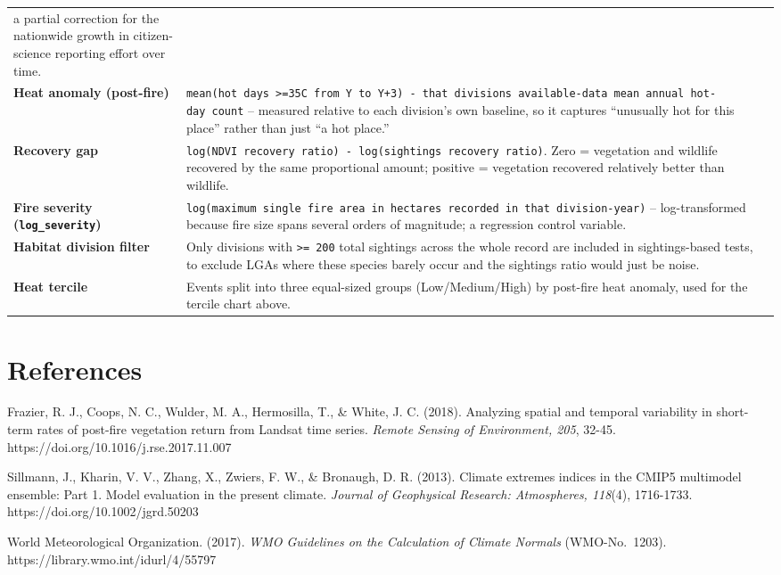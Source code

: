 \documentclass[
  letterpaper,
  DIV=11,
  numbers=noendperiod]{scrartcl}
\begin{document}
\begin{longtable}[]{@{}
  >{\raggedright\arraybackslash}p{}
  >{\raggedright\arraybackslash}p{}@{}}
a partial correction for the nationwide growth in citizen-science
reporting effort over time. \\
\textbf{Heat anomaly (post-fire)} &
\texttt{mean(hot\ days\ \textgreater{}=35C\ from\ Y\ to\ Y+3)\ -\ that\ division\textquotesingle{}s\ available-data\ mean\ annual\ hot-day\ count}
-- measured relative to each division's own baseline, so it captures
``unusually hot for this place'' rather than just ``a hot place.'' \\
\textbf{Recovery gap} &
\texttt{log(NDVI\ recovery\ ratio)\ -\ log(sightings\ recovery\ ratio)}.
Zero = vegetation and wildlife recovered by the same proportional
amount; positive = vegetation recovered relatively better than
wildlife. \\
\textbf{Fire severity (\texttt{log\_severity})} &
\texttt{log(maximum\ single\ fire\ area\ in\ hectares\ recorded\ in\ that\ division-year)}
-- log-transformed because fire size spans several orders of magnitude;
a regression control variable. \\
\textbf{Habitat division filter} & Only divisions with
\texttt{\textgreater{}=\ 200} total sightings across the whole record
are included in sightings-based tests, to exclude LGAs where these
species barely occur and the sightings ratio would just be noise. \\
\textbf{Heat tercile} & Events split into three equal-sized groups
(Low/Medium/High) by post-fire heat anomaly, used for the tercile chart
above. \\
\end{longtable}

\section{References}\label{references}

Frazier, R. J., Coops, N. C., Wulder, M. A., Hermosilla, T., \& White,
J. C. (2018). Analyzing spatial and temporal variability in short-term
rates of post-fire vegetation return from Landsat time series.
\emph{Remote Sensing of Environment, 205}, 32-45.
https://doi.org/10.1016/j.rse.2017.11.007

Sillmann, J., Kharin, V. V., Zhang, X., Zwiers, F. W., \& Bronaugh, D.
R. (2013). Climate extremes indices in the CMIP5 multimodel ensemble:
Part 1. Model evaluation in the present climate. \emph{Journal of
Geophysical Research: Atmospheres, 118}(4), 1716-1733.
https://doi.org/10.1002/jgrd.50203

World Meteorological Organization. (2017). \emph{WMO Guidelines on the
Calculation of Climate Normals} (WMO-No.~1203).
https://library.wmo.int/idurl/4/55797
\end{document}
